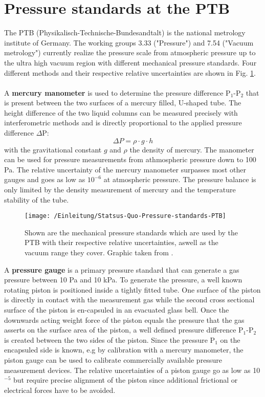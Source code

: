 \section{Pressure standards at the PTB}
The PTB (Physikalisch-Technische-Bundesandtalt) is the national metrology institute of Germany. The working groups 3.33 ("Pressure") and 7.54 ("Vacuum metrology") currently realize the pressure scale from atmospheric pressure up to the ultra high vacuum region with different mechanical pressure standards. Four different methods and their respective relative uncertainties are shown in Fig. \ref{Pressure_standards_status_quo}.\\\\ A \textbf{mercury manometer} is used to determine the pressure difference P$_1$-P$_2$ that is present between the two surfaces of a mercury filled, U-shaped tube. The height difference of the two liquid columns can be measured precisely with interferometric methods and is directly proportional to the applied pressure difference $\Delta $P:
\begin{equation}
\Delta P = \rho \cdot g \cdot h
\label{Hg-manometer}
\end{equation}
with the gravitational constant $g$ and $\rho$ the density of mercury. The manometer can be used for pressure measurements from athmospheric pressure down to 100 Pa. The relative uncertainty of the mercury manometer surpasses most other gauges and goes as low as $10^{-6}$ at atmospheric pressure. The pressure balance is only limited by the density measurement of mercury and the temperature stability of the tube.
\newpage 
\begin{figure}[H]
	\centering
	\texttt{[image: /Einleitung/Statsus-Quo-Pressure-standards-PTB]}
	\caption{Shown are the mechanical pressure standards which are used by the PTB with their respective relative uncertainties, aswell as the vacuum range they cover. Graphic taken from \cite{Rubin2016}.}
	\label{Pressure_standards_status_quo}
\end{figure}
\noindent
A \textbf{pressure gauge} is a primary pressure standard that can generate a gas pressure between 10 Pa and 10 kPa. To generate the pressure, a well known rotating piston is positioned inside a tightly fitted tube. One surface of the piston is directly in contact with the measurement gas while the second cross sectional surface of the piston is en-capsuled in an evacuated glass bell. Once the downwards acting weight force of the piston equals the pressure that the gas asserts on the surface area of the piston, a well defined pressure difference P$_1$-P${_2}$ is created between the two sides of the piston. Since the pressure P$_1$ on the encapsuled side is known, e.g by calibration with a mercury manometer, the piston gauge can be used to calibrate commercially available pressure measurement devices. The relative uncertainties of a piston gauge go as low as 10$^{-5}$ but require precise alignment of the piston since additional frictional or electrical forces have to be avoided.\\\\
